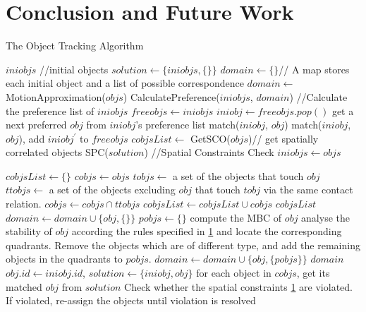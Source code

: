 \documentclass[letterpaper]{article}
\begin{document}
\section{Conclusion and Future Work}
\begin{algorithm}[!]
\caption{The Object Tracking Algorithm}\label{algo}
\begin{algorithmic}[1]
\State $iniobjs$ //initial objects
\State $solution \leftarrow \{iniobjs, \{\}\}$
\State $domain \leftarrow \{\}$// A map stores each initial object and a list of possible correspondence 
\State $domain \leftarrow$ MotionApproximation($objs$) 
\State CalculatePreference($iniobjs$, $domain$) //Calculate the preference list of $iniobjs$
\State $freeobjs \leftarrow iniobjs$
\State $iniobj \leftarrow freeobjs.pop()$
\State get a next preferred $obj$ from $iniobj$'s preference list  
  \State match($iniobj$, $obj$)
  \State match($iniobj$, $obj$), add $iniobj^{\prime}$ to $freeobjs$
\EndIf 
\EndIf
\EndWhile
\State $cobjsList \leftarrow$ GetSCO($objs$)// get spatially correlated objects
\State SPC($solution$) //Spatial Constraints Check
\State $iniobjs \leftarrow objs$
\EndProcedure

\State $cobjsList \leftarrow \{\}$
\State $cobjs \leftarrow objs$ 
\State $tobjs \leftarrow$ a set of the objects that touch $obj$
\State $ttobjs \leftarrow$ a set of the objects excluding $obj$ that touch $tobj$ via the same contact relation.
\State $cobjs \leftarrow cobjs \cap ttobjs$
\EndFor
\State $cobjsList \leftarrow cobjsList \cup cobjs$
\EndFor
\Return $cobjsList$
\EndProcedure
{}
\State $domain \leftarrow domain \cup \{obj, \{\}\}$
\State $pobjs \leftarrow \{\}$
\State compute the MBC of $obj$
\State analyse the stability of $obj$ according the rules specified in \ref{} and locate the corresponding quadrants.
\State Remove the objects which are of different type, and add the remaining objects in the quadrants to $pobjs$. 
\State $domain \leftarrow domain \cup \{obj, \{pobjs\}\}$
\EndFor
\Return $domain$
\EndProcedure
{}
\State $obj.id \leftarrow iniobj.id$, $solution \leftarrow \{iniobj, obj\}$
\EndProcedure
{}
\State for each object in $cobjs$, get its matched $obj$ from $solution$
\State Check whether the spatial constraints \ref{} are violated. If violated, re-assign the objects until violation is resolved  
\EndFor
\EndProcedure
\end{algorithmic}
\end{algorithm}
 
\end{document}
